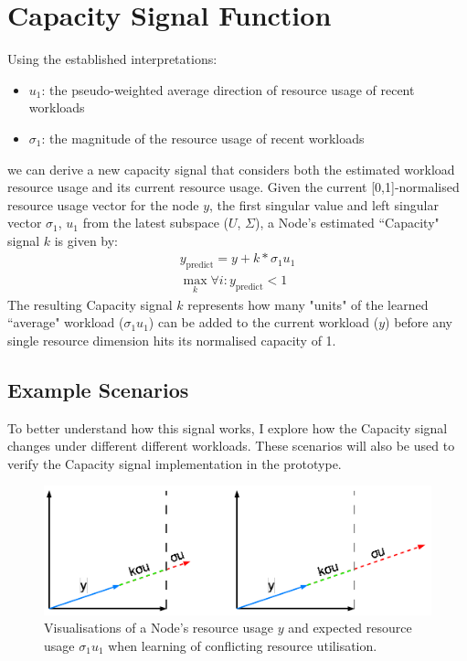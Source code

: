 \section{Capacity Signal Function}
\label{sec:capacity-signal}
Using the established interpretations:
\begin{itemize}
    \item $u_1$: the pseudo-weighted average direction of resource usage of
        recent workloads
    \item $\sigma_1$: the magnitude of the resource usage of recent workloads
\end{itemize}
we can derive a new capacity signal that considers both the estimated
workload resource usage and its current resource usage. Given the current
[0,1]-normalised resource usage vector for the node $y$, the first singular
value and left singular vector $\sigma_1$, $u_1$ from the latest subspace ($U$,
$\Sigma$), a Node's estimated ``Capacity" signal $k$ is given by:
\begin{align}
    y_{\text{predict}} = y + k * \sigma_1 u_1 \\
    \max_k \forall i: y_{\text{predict}} < 1
\end{align}
The resulting Capacity signal $k$ represents how many "units" of the learned
``average" workload ($\sigma_1 u_1$) can be added to the current workload ($y$)
before any single resource dimension hits its normalised capacity of 1.
%
\subsection{Example Scenarios}
\label{sec:signal-example-scenario}
To better understand how this signal works, I explore how the Capacity signal
changes under different different workloads. These scenarios will also be used to
verify the Capacity signal implementation in the prototype.

\begin{figure}[ht!]
    \centering
    \includegraphics[width=\textwidth]{images/conflicting-workload.pdf}
    \caption{Visualisations of a Node's resource usage $y$ and expected resource
    usage $\sigma_1 u_1$ when learning of conflicting resource utilisation.}
    \label{fig:conflicting-workload}
\end{figure}

